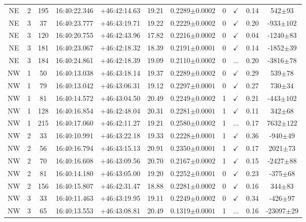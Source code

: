\begin{landscape}
\begin{longtable}{ccccccccccc}
	NE & 2 & 195 & 16:40:22.346 & +46:42:14.63 & 19.21 & 0.2289$\pm{0.0002}$ & 0 & $\checkmark$ & 0.14 & 542$\pm{93}$ \\
	NE & 3 & 37 & 16:40:23.777 & +46:43:19.71 & 19.22 & 0.2229$\pm{0.0002}$ & 0 & $\checkmark$ & 0.20 & -933$\pm{102}$ \\
	NE & 3 & 120 & 16:40:20.755 & +46:42:43.96 & 17.82 & 0.2216$\pm{0.0002}$ & 0 & $\checkmark$ & 0.04 & -1240$\pm{83}$ \\
	NE & 3 & 181 & 16:40:23.067 & +46:42:18.32 & 18.39 & 0.2191$\pm{0.0001}$ & 0 & $\checkmark$ & 0.14 & -1852$\pm{39}$ \\
	NE & 3 & 184 & 16:40:24.861 & +46:42:18.39 & 19.09 & 0.2110$\pm{0.0002}$ & 0 & ... & 0.20 & -3816$\pm{78}$ \\
	NW & 1 & 50 & 16:40:13.038 & +46:43:18.14 & 19.37 & 0.2289$\pm{0.0002}$ & 0 & $\checkmark$ & 0.29 & 539$\pm{78}$ \\
	NW & 1 & 79 & 16:40:13.042 & +46:43:06.31 & 19.12 & 0.2297$\pm{0.0001}$ & 0 & $\checkmark$ & 0.27 & 730$\pm{34}$ \\
	NW & 1 & 81 & 16:40:14.572 & +46:43:04.50 & 20.49 & 0.2249$\pm{0.0002}$ & 1 & $\checkmark$ & 0.21 & -443$\pm{102}$ \\
	NW & 1 & 128 & 16:40:16.854 & +46:42:48.04 & 20.31 & 0.2281$\pm{0.0001}$ & 1 & $\checkmark$ & 0.11 & 342$\pm{68}$ \\
	NW & 1 & 215 & 16:40:17.060 & +46:42:11.27 & 19.21 & 0.2580$\pm{0.0002}$ & 1 & ... & 0.17 & 7632$\pm{122}$ \\
	NW & 2 & 33 & 16:40:10.991 & +46:43:22.18 & 19.33 & 0.2228$\pm{0.0001}$ & 1 & $\checkmark$ & 0.36 & -940$\pm{49}$ \\
	NW & 2 & 56 & 16:40:16.794 & +46:43:15.13 & 20.91 & 0.2350$\pm{0.0001}$ & 1 & $\checkmark$ & 0.17 & 2021$\pm{73}$ \\
	NW & 2 & 70 & 16:40:16.608 & +46:43:09.56 & 20.70 & 0.2167$\pm{0.0002}$ & 1 & $\checkmark$ & 0.15 & -2427$\pm{88}$ \\
	NW & 2 & 81 & 16:40:14.180 & +46:43:05.00 & 19.20 & 0.2252$\pm{0.0001}$ & 0 & $\checkmark$ & 0.23 & -375$\pm{68}$ \\
	NW & 2 & 156 & 16:40:15.807 & +46:42:31.47 & 18.88 & 0.2281$\pm{0.0002}$ & 0 & $\checkmark$ & 0.16 & 344$\pm{83}$ \\
	NW & 3 & 33 & 16:40:11.463 & +46:43:19.95 & 19.11 & 0.2249$\pm{0.0002}$ & 0 & $\checkmark$ & 0.34 & -426$\pm{97}$ \\
	NW & 3 & 65 & 16:40:13.553 & +46:43:08.81 & 20.49 & 0.1319$\pm{0.0001}$ & 1 & ... & 0.16 & -23097$\pm{29}$ \\

\end{longtable}
\end{landscape}

